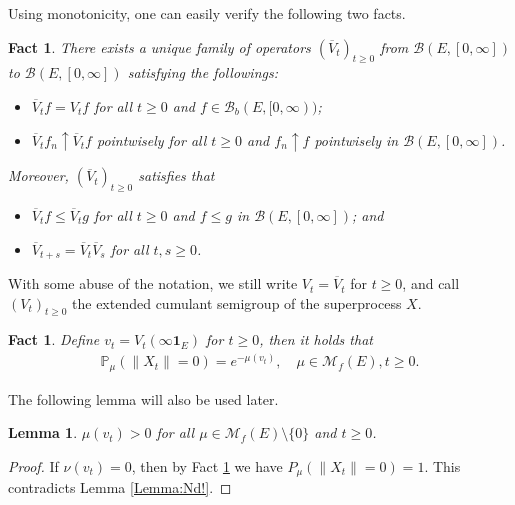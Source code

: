 \documentclass[12pt,a4paper]{amsart}
\numberwithin{equation}{section}
\theoremstyle{plain}
\newtheorem{lem}[thm]{Lemma}
\newtheorem{fact}[thm]{Fact}
\theoremstyle{definition}
\theoremstyle{remark}
\begin{document}
\subsubsection{}
\label{subsubsec:OY}
Using monotonicity, one can easily verify the following two facts.
\begin{fact} \label{Fact:BV!}
There exists a unique family of operators $(\overline V_t)_{t \geq 0}$ from $\mathcal B(E, [0,\infty])$ to $\mathcal B(E, [0,\infty])$ satisfying the followings:
\begin{itemize}
\item
$\overline V_tf = V_tf$ for all $t\geq 0$ and $f \in \mathcal B_b(E, [0,\infty))$;
\item
$\overline V_tf_n \uparrow \overline V_t f$ pointwisely for all $t\geq 0$ and $f_n \uparrow f$ pointwisely in $\mathcal B(E, [0,\infty])$.
\end{itemize}
Moreover, $(\overline V_t)_{t\geq 0}$ satisfies that
\begin{itemize}
\item
$\overline V_t f \leq \overline V_t g$ for all $t\geq 0$ and  $f\leq g$ in $\mathcal B(E,[0,\infty])$; and
\item
$\overline V_{t+s} = \overline V_t \overline V_s$ for all $t, s\geq 0$.
\end{itemize}
\end{fact}
With some abuse of the notation, we still write $V_t = \overline V_t$ for $t\geq 0$, and call $(V_t)_{t\geq 0}$ the extended cumulant semigroup of the superprocess $X$.
\begin{fact} \label{Fact:sv1!}
Define $v_t = V_t(\infty\mathbf 1_E)$ for $t\geq 0$, then it holds that
\begin{align}
\mathbb P_\mu (\|X_t\| = 0)
= e^{- \mu (v_t)},
\quad \mu \in \mathcal M_f(E), t\geq 0.
\end{align}
\end{fact}
The following lemma will also be used later.
\begin{lem} \label{Lemma:sv2!}
$\mu(v_t) > 0$ for all $\mu \in \mathcal M_f(E)\setminus\{0\}$ and $t \geq 0$.
\end{lem}
\begin{proof}
If $\nu(v_t) = 0$, then by Fact \ref{Fact:sv1!} we have $P_\mu(\|X_t \| = 0) = 1$.
This contradicts Lemma \ref{Lemma:Nd!}.
\end{proof}
\end{document}
